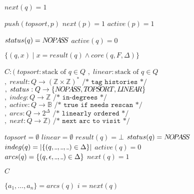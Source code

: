 \documentclass[AMA,STIX1COL]{WileyNJD-v2}
\newcommand{\Xund}{\rule{.4em}{.4pt}}
\newcommand{\YB}{\mathbb{B}}
\newcommand{\YZ}{\mathbb{Z}}
\begin{document}
\begin{figure*}
\begin{multicols}{2}
\begin{algorithm}[H]
{{{                %
                 {

                    $next(q) = 1$ \;
                     {

                         {
                            $push(topsort, p)$ \;
                            $next(p) = 1$ \;
                        }
                         {
                            $active(p) = 1$ \;
                        }
                    }
                }

                $status(q) = N\!O\!P\!A\!S\!S$ \;
                $active(q) = 0$ \;
            }
        }

        \BlankLine
        \Return $\big\{ (q, x) \mid x = result(q) \wedge core(q, F, \Delta) \}$ \;
    }
    \end{algorithm}

    \columnbreak

    \begin{algorithm}[H] \DontPrintSemicolon {} 
     {
        $C : (\; topsort : \text{stack of } q \in Q$ \;
        \Indp
        $,\; linear  : \text{stack of } q \in Q$ \;
        $,\; result  : Q \rightarrow (\YZ \times \YZ)^* \texttt{ /* tag histories */}$ \;
        $,\; status  : Q \rightarrow \{ \NOPASS, \TOPSORT, \LINEAR \}$ \;
        $,\; indeg   : Q \rightarrow \YZ \texttt{ /* in-degrees */}$ \;
        $,\; active  : Q \rightarrow \YB \texttt{ /* true if needs rescan */}$ \;
        $,\; arcs    : Q \rightarrow 2^\Delta \texttt{ /* linearly ordered */}$ \;
        $,\; next    : Q \rightarrow \YZ) \texttt{ /* next arc to visit */}$ \;
        \Indm

        \BlankLine
         {
            $topsort   = \emptyset$ \;
            $linear    = \emptyset$ \;
            $result(q) = \bot$ \;
            $status(q) = N\!O\!P\!A\!S\!S$ \;
            $indeg(q)  = | \{ (q, \Xund, \Xund, \Xund) \in \Delta \} |$ \;
            $active(q) = 0$ \;
            $arcs(q)   = \{ (q, \epsilon, \Xund, \Xund) \in \Delta \}$ \;
            $next(q)   = 1$ \;
        }

        \BlankLine
        \Return $C$ \;
    }
    \end{algorithm}

    \begin{algorithm}[H] \DontPrintSemicolon {} 
     {
        $\{ a_1, \dots, a_n \} = arcs (q)$ \;
        $i = next (q)$ \;

}
\end{algorithm}
\end{multicols}
\end{figure*}
\end{document}
